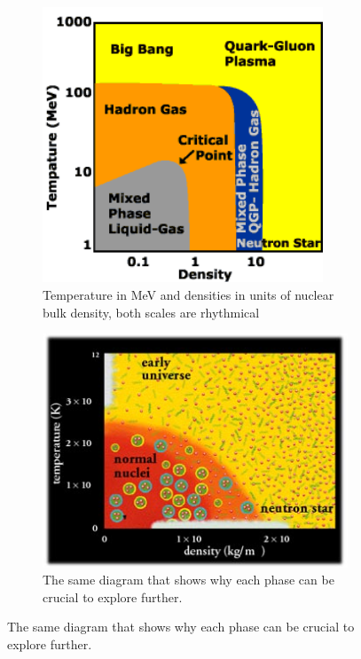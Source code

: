 \documentclass[a4paper,12pt]{article}
\begin{document}
 \begin{figure}[H]
\centering
\begin{subfigure}{.49\textwidth}
\centering
\includegraphics[width=0.92\textwidth]{cbm_phase1.png}
\caption{ Temperature in MeV and densities in units of nuclear bulk density, both scales are rhythmical }
\end{subfigure}
\begin{subfigure}{.49\textwidth}
\includegraphics[width=.92\textwidth]{cbm_phase2.jpg}
\caption{ The same diagram that shows why each phase can be crucial to explore further.  }
\end{subfigure}
\end{figure}
\end{document}
